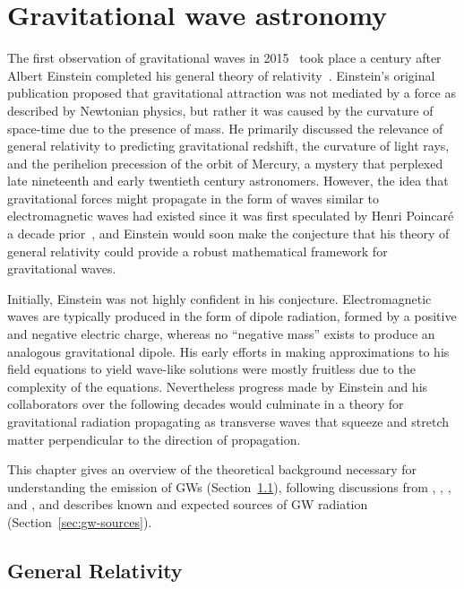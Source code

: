 \chapter{Gravitational wave astronomy}\label{ch:gw}

The first observation of gravitational waves in 2015~\citep{gw150914} took place a century after Albert Einstein completed his general theory of relativity~\citep{Einstein_1916}.
Einstein's original publication proposed that gravitational attraction was not mediated by a force as described by Newtonian physics, but rather it was caused by the curvature of space-time due to the presence of mass.
He primarily discussed the relevance of general relativity to predicting gravitational redshift, the curvature of light rays, and the perihelion precession of the orbit of Mercury, a mystery that perplexed late nineteenth and early twentieth century astronomers.
However, the idea that gravitational forces might propagate in the form of waves similar to electromagnetic waves had existed since it was first speculated by Henri Poincar\'e a decade prior~\citep{Poincare_1905}, and Einstein would soon make the conjecture that his theory of general relativity could provide a robust mathematical framework for gravitational waves.

Initially, Einstein was not highly confident in his conjecture.
Electromagnetic waves are typically produced in the form of dipole radiation, formed by a positive and negative electric charge, whereas no ``negative mass'' exists to produce an analogous gravitational dipole.
His early efforts in making approximations to his field equations to yield wave-like solutions were mostly fruitless due to the complexity of the equations.
Nevertheless progress made by Einstein and his collaborators over the following decades would culminate in a theory for gravitational radiation propagating as transverse waves that squeeze and stretch matter perpendicular to the direction of propagation.

This chapter gives an overview of the theoretical background necessary for understanding the emission of \acp{GW} (Section~\ref{sec:gw-gr}), following discussions from \citet{Creighton_2011}, \citet{Hartle_2003}, \citet{Jaranowski_2009}, and \citet{Misner_1973}, and describes known and expected sources of \ac{GW} radiation (Section~\ref{sec:gw-sources}).


\section{General Relativity}\label{sec:gw-gr}

